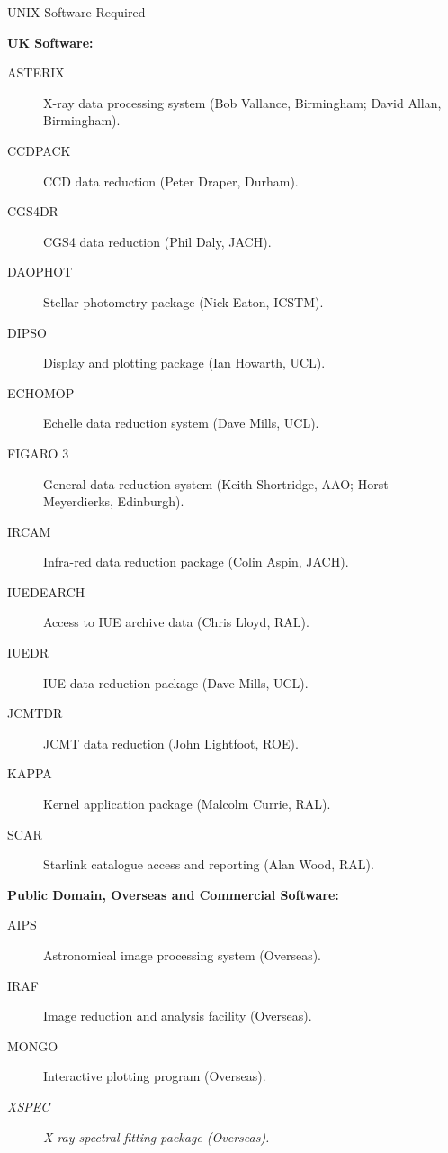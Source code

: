 \vspace{5mm}
\begin{center}
{\large\sc UNIX Software Required}
\end{center}

\begin{center}
{\bf UK Software:}
\end{center}

\begin{description}
\item[ASTERIX] X-ray data processing system (Bob Vallance, Birmingham; 
David Allan, Birmingham).
\item[CCDPACK] CCD data reduction (Peter Draper, Durham).
\item[CGS4DR] CGS4 data reduction (Phil Daly, JACH).
\item[DAOPHOT] Stellar photometry package (Nick Eaton, ICSTM).
\item[DIPSO] Display and plotting package (Ian Howarth, UCL).
\item[ECHOMOP] Echelle data reduction system (Dave Mills, UCL).
\item[FIGARO 3] General data reduction system (Keith Shortridge, AAO; Horst
Meyerdierks, Edinburgh).
\item[IRCAM] Infra-red data reduction package (Colin Aspin, JACH).
\item[IUEDEARCH] Access to IUE archive data (Chris Lloyd, RAL).
\item[IUEDR] IUE data reduction package (Dave Mills, UCL).
\item[JCMTDR] JCMT data reduction (John Lightfoot, ROE).
\item[KAPPA] Kernel application package (Malcolm Currie, RAL).
\item[SCAR] Starlink catalogue access and reporting (Alan Wood, RAL).
\end{description}


\vspace{5mm}
\begin{center}
{\bf Public Domain, Overseas and Commercial Software:}
\end{center}

\begin{description}
\item[AIPS] Astronomical image processing system (Overseas).
\item[IRAF] Image reduction and analysis facility (Overseas).
\item[MONGO] Interactive plotting program (Overseas).
\item[{\em XSPEC}] {\em X-ray spectral fitting package (Overseas).}
\end{description}


